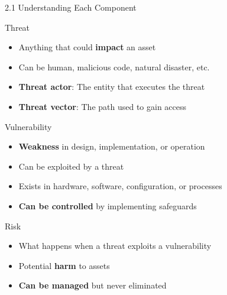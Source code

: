 \documentclass[9pt]{beamer}  %
\begin{document}
	\begin{frame}{2.1 Understanding Each Component}
		\begin{block}{Threat}
			\begin{itemize}
				\item Anything that could \textbf{impact} an asset
				\item Can be human, malicious code, natural disaster, etc.
				\item \textbf{Threat actor}: The entity that executes the threat
				\item \textbf{Threat vector}: The path used to gain access
			\end{itemize}
		\end{block}
		
		\begin{block}{Vulnerability}
			\begin{itemize}
				\item \textbf{Weakness} in design, implementation, or operation
				\item Can be exploited by a threat
				\item Exists in hardware, software, configuration, or processes
				\item \textbf{Can be controlled} by implementing safeguards
			\end{itemize}
		\end{block}
		
		\begin{block}{Risk}
			\begin{itemize}
				\item What happens when a threat exploits a vulnerability
				\item Potential \textbf{harm} to assets
				\item \textbf{Can be managed} but never eliminated
			\end{itemize}
		\end{block}
	\end{frame}
	
\end{document}
